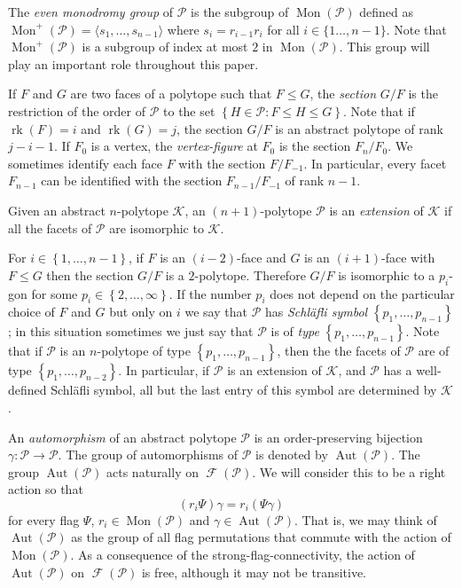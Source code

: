 \documentclass[final]{amsart}
\theoremstyle{plain}
\theoremstyle{definition}
\theoremstyle{remark}
\numberwithin{equation}{section}
\renewcommand{\leq}{\leqslant} \renewcommand{\geq}{\geqslant}
\renewcommand{\{}{\lbrace}
\renewcommand{\}}{\rbrace}
\newcommand{\cK}{\mathcal{K}}
\newcommand{\cP}{\mathcal{P}}
\DeclareMathOperator{\aut}{Aut} \DeclareMathOperator{\autp}{\aut^{+}}
\DeclareMathOperator{\rk}{rk}
\DeclareMathOperator{\fl}{\mathcal{F}}
\DeclareMathOperator{\mon}{Mon}
\begin{document}
The {\em even monodromy group} of $\cP$ is the subgroup of  $\mon(\cP)$  defined as $\mon^+(\cP) = \langle s_1, \ldots, s_{n-1} \rangle$ where $s_{i}=r_{i-1}r_{i}$ for all $i \in \{1\ldots,n-1\}$. Note that $\mon^+(\cP)$ is a subgroup of index at most $2$ in $\mon(\cP)$. This group will play an important role throughout this paper.

If $F$ and $G$ are two faces of a polytope such that $F \leq G$, the \emph{section} $G/F$ is the restriction of the order of $\cP$ to the set $\left\{ H \in \cP : F \leq H \leq G \right\} $.
Note that if $\rk(F) = i$ and $\rk(G) = j$, the section $G/F$ is an abstract polytope of rank $j-i-1$.
If $F_{0}$ is a vertex, the \emph{vertex-figure} at $F_{0}$ is the section $F_{n}/F_{0}$. 
We sometimes identify each face $F$ with the section $F/F_{-1}$. 
In particular, every facet $F_{n-1}$ can be identified with the section $F_{n-1}/F_{-1}$ of rank $n-1$.

Given an abstract $n$-polytope $\cK$, an $(n+1)$-polytope $\cP$ is an \emph{extension} of $\cK$ if all the facets of $\cP$ are isomorphic to $\cK$.

For $i \in \left\{ 1, \dots, n-1 \right\} $, if $F$ is an $(i-2)$-face and $G$ is an $(i+1)$-face with $F \leq G$ then the section $G/F$ is a $2$-polytope. 
Therefore $G/F$ is isomorphic to a $p_{i}$-gon for some $p_{i} \in \left\{ 2, \dots, \infty \right\} $. 
If the number $p_{i}$ does not depend on the particular choice of $F$ and $G$ but only on $i$ we say that $\cP$ has \emph{Schläfli symbol} $\left\{ p_{1}, \dots, p_{n-1} \right\}$;
in this situation sometimes we just say that $\cP$ is of \emph{type} $\left\{ p_{1}, \dots, p_{n-1} \right\} $.
Note that if $\cP$ is an $n$-polytope of type $\left\{ p_{1}, \dots, p_{n-1} \right\} $, then the the facets of $\cP$ are of type $\left\{ p_{1}, \dots, p_{n-2} \right\} $.
In particular, if $\cP$ is an extension of $\cK$, and $\cP$ has a well-defined Schläfli symbol, all but the last entry of this symbol are determined by $\cK$.

An \emph{automorphism} of an abstract polytope $\cP$ is an order-preserving bijection $\gamma: \cP \to \cP$.
The group of automorphisms of $\cP$ is denoted by $\aut(\cP)$.
The group $\aut(\cP)$ acts naturally on $\fl(\cP)$. We will consider this to be a right action so that \[(r_i\Psi) \gamma = r_i( \Psi \gamma )\] for every flag $\Psi$, $r_i \in \mon(\cP)$ and $\gamma \in \aut(\cP)$.
That is, we may think of $\aut(\cP)$ as the group of all flag permutations that commute with the action of $\mon(\cP)$. As a consequence of the strong-flag-connectivity, the action  of $\aut(\cP)$ on $\fl(\cP)$ is free, although it may not be transitive.
\end{document}
